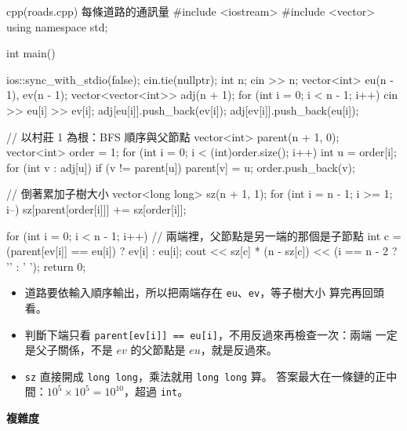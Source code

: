 \begin{example}[label=ex:roads]{cpp}{(roads.cpp) 每條道路的通訊量}
#include <iostream>
#include <vector>
using namespace std;

int main() {
    ios::sync_with_stdio(false);
    cin.tie(nullptr);
    int n;
    cin >> n;
    vector<int> eu(n - 1), ev(n - 1);
    vector<vector<int>> adj(n + 1);
    for (int i = 0; i < n - 1; i++) {
        cin >> eu[i] >> ev[i];
        adj[eu[i]].push_back(ev[i]);
        adj[ev[i]].push_back(eu[i]);
    }

    // 以村莊 1 為根：BFS 順序與父節點
    vector<int> parent(n + 1, 0);
    vector<int> order = {1};
    for (int i = 0; i < (int)order.size(); i++) {
        int u = order[i];
        for (int v : adj[u]) {
            if (v != parent[u]) {
                parent[v] = u;
                order.push_back(v);
            }
        }
    }

    // 倒著累加子樹大小
    vector<long long> sz(n + 1, 1);
    for (int i = n - 1; i >= 1; i--) {
        sz[parent[order[i]]] += sz[order[i]];
    }

    for (int i = 0; i < n - 1; i++) {
        // 兩端裡，父節點是另一端的那個是子節點
        int c = (parent[ev[i]] == eu[i]) ? ev[i] : eu[i];
        cout << sz[c] * (n - sz[c]) << (i == n - 2 ? '\n' : ' ');
    }
    return 0;
}
\end{example}


\begin{itemize}
\item 道路要依輸入順序輸出，所以把兩端存在 \texttt{eu}、\texttt{ev}，等子樹大小
算完再回頭看。
\item 判斷下端只看 \texttt{parent[ev[i]] == eu[i]}，不用反過來再檢查一次：兩端
一定是父子關係，不是 $\mathit{ev}$ 的父節點是 $\mathit{eu}$，就是反過來。
\item \texttt{sz} 直接開成 \texttt{long long}，乘法就用 \texttt{long long} 算。
答案最大在一條鏈的正中間：$10^5 \times 10^5 = 10^{10}$，超過 \texttt{int}。
\end{itemize}

\textbf{複雜度}

